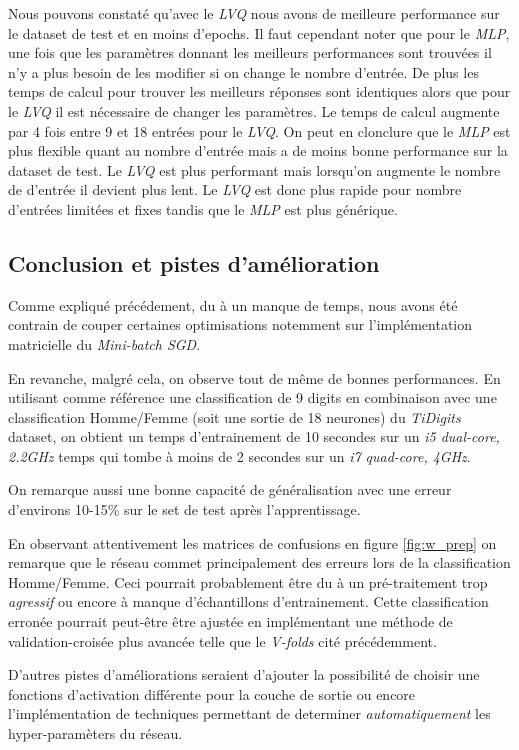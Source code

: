 \documentclass[11pt]{article}
\begin{document}
Nous pouvons constat\'e qu'avec le {\em LVQ} nous avons de meilleure
performance sur le dataset de test et en moins d'epochs. Il faut cependant
noter que pour le {\em MLP}, une fois que les param\`etres donnant les
meilleurs performances sont trouv\'ees il n'y a plus besoin de les modifier si
on change le nombre d'entr\'ee. De plus les temps de calcul pour trouver les
meilleurs r\'eponses
sont identiques alors que pour le {\em LVQ} il est n\'ecessaire de changer les
param\`etres. Le temps de calcul augmente par 4 fois entre 9 et 18 entr\'ees pour
le {\em LVQ}. On peut en clonclure que le {\em MLP} est plus flexible quant au
nombre d'entr\'ee mais a de moins bonne performance sur la dataset de test. Le
{\em LVQ} est plus performant mais lorsqu'on augmente le nombre de d'entr\'ee il devient
plus lent.
Le {\em LVQ} est donc plus rapide pour nombre d'entr\'ees limit\'ees et fixes
tandis que le {\em MLP} est plus g\'en\'erique.

\subsection{Conclusion et pistes d'am\'elioration}
Comme expliqu\'e pr\'ec\'edement, du \`a un manque de temps, nous avons
\'et\'e contrain de couper certaines optimisations notemment sur
l'impl\'ementation matricielle du {\em Mini-batch SGD}.

En revanche, malgr\'e cela, on observe tout de m\^eme de bonnes performances.
En utilisant comme r\'ef\'erence une classification de 9 digits en combinaison
avec une classification Homme/Femme (soit une sortie de 18 neurones) du
{\em TiDigits} dataset, on obtient un temps d'entrainement de 10 secondes sur un
{\em i5 dual-core, 2.2GHz} temps qui tombe \`a moins de 2 secondes sur un
{\em i7 quad-core, 4GHz}.

On remarque aussi une bonne capacit\'e de g\'en\'eralisation avec une erreur
d'environs 10-15\% sur le set de test apr\`es l'apprentissage.

En observant attentivement les matrices de
confusions en figure \ref{fig:w_prep} on remarque que le r\'eseau commet
principalement des erreurs lors de la classification Homme/Femme. Ceci pourrait
probablement \^etre du \`a un pr\'e-traitement trop {\em agressif} ou encore \`a
manque d'\'echantillons d'entrainement. Cette classification erron\'ee pourrait
peut-\^etre \^etre ajust\'ee en impl\'ementant une m\'ethode de
validation-crois\'ee plus avanc\'ee telle que le {\em V-folds} cit\'e pr\'ec\'edemment.

D'autres pistes d'am\'eliorations seraient d'ajouter la possibilit\'e de choisir une
fonctions d'activation diff\'erente pour la couche de sortie ou encore
l'impl\'ementation de techniques permettant de determiner {\em automatiquement}
les hyper-param\`eters du r\'eseau.
\end{document}
